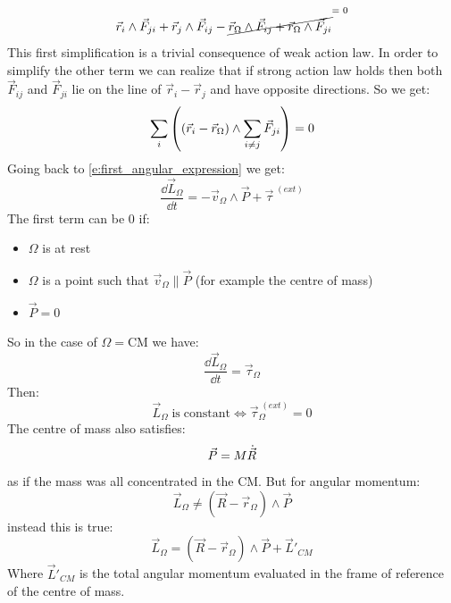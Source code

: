\begin{equation}
    \vec{r}_i\wedge\vec{F}_{ji} + \vec{r}_j\wedge\vec{F}_{ij}-\crossout{{\vec{r}_{\Omega}\wedge\vec{F}_{ij}+\vec{r}_{\Omega}\wedge\vec{F}_{ji}}}
\end{equation}
This first simplification is a trivial consequence of weak action law. In order to simplify the other term we can realize that if strong action law holds then both $\vec{F}_{ij}$ and $\vec{F}_{ji}$ lie on the line of $\vec{r}_i-\vec{r}_j$ and have opposite directions.
So we get:
\begin{equation}
    \displaystyle\sum_{i}\left(\left(\vec{r}_i-\vec{r}_{\Omega}\right)\wedge\displaystyle\sum_{i\neq j}\vec{F}_{ji}\right) = 0
\end{equation}
Going back to \eqref{e:first_angular_expression} we get:
\begin{equation}
    \dfrac{\dd{\vec{L}_{\Omega}}}{\dd{t}} = -\vec{v}_{\Omega}\wedge\vec{P} + \vec{\tau}^{\;(ext)}
\end{equation}
The first term can be 0 if:
\begin{itemize}
    \item $\Omega$ is at rest
    \item $\Omega$ is a point such that $\vec{v}_{\Omega} \parallel \vec{P}$ (for example the centre of mass)
    \item $\vec{P}=0$
\end{itemize}
So in the case of $\Omega = \mathrm{CM}$ we have:
\begin{equation} \label{e:first_cardinal}
    \dfrac{\dd{\vec{L}_{\Omega}}}{\dd{t}} = \vec{\tau}_{\Omega}
\end{equation}
Then:
\begin{equation}
    \vec{L}_{\Omega}\;\mathrm{is\;constant} \iff \vec{\tau}_{\Omega}^{\;(ext)}=0
\end{equation}
The centre of mass also satisfies:
\begin{equation}
    \vec{P} = M\dot{\vec{R}}
\end{equation}
as if the mass was all concentrated in the CM. But for angular momentum:
\begin{equation}
    \vec{L}_{\Omega} \neq (\vec{R}-\vec{r}_{\Omega})\wedge\vec{P}
\end{equation}
instead this is true:
\begin{equation}
    \vec{L}_{\Omega} = (\vec{R}-\vec{r}_{\Omega})\wedge\vec{P} + \vec{L}'_{CM}
\end{equation}
Where $\vec{L}'_{CM}$ is the total angular momentum evaluated in the frame of reference of the centre of mass.\\
